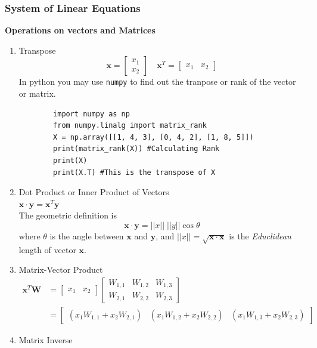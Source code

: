 \documentclass{article}
\newcommand{\matr}[1]{\mathbf{#1}}
\begin{document}
\subsubsection{System of Linear Equations}
\textbf{Operations on vectors and Matrices}
\begin{enumerate}
    \item Transpose \\
    \[\matr{x} = \begin{bmatrix}
        x_1 \\
        x_2
    \end{bmatrix} \quad \matr{x}^T = \begin{bmatrix}
        x_1& x_2
    \end{bmatrix}\]
    In python you may use \texttt{numpy} to find out the tranpose or rank of the vector or matrix.
    \begin{verbatim}
        import numpy as np
        from numpy.linalg import matrix_rank
        X = np.array([[1, 4, 3], [0, 4, 2], [1, 8, 5]]) 
        print(matrix_rank(X)) #Calculating Rank
        print(X)
        print(X.T) #This is the transpose of X
    \end{verbatim}
    \item Dot Product or Inner Product of Vectors \\
    $\matr{x}\cdot\matr{y} = \matr{x}^T\matr{y}$\\
    The geometric definition is 
    \[\matr{x}\cdot\matr{y} = ||x||\;||y||\cos{\theta}\]
    where $\theta$ is the angle between $\matr{x}$ and $\matr{y}$, and $||x|| = \sqrt{\matr{x}\cdot\matr{x}}$ is the \textit{Educlidean} length of vector $\matr{x}$.
    \item Matrix-Vector Product 
    \begin{align*}
        \matr{x}^T\matr{W} &= \begin{bmatrix} x_1 & x_2 \end{bmatrix} \begin{bmatrix} W_{1,1} & W_{1,2} & W_{1,3} \\ W_{2,1} & W_{2,2} & W_{2,3} \end{bmatrix}\\
        & = \begin{bmatrix} (x_1 W_{1,1} + x_2 W_{2,1}) & (x_1 W_{1,2} + x_2 W_{2,2}) & (x_1 W_{1,3} + x_2 W_{2,3}) \end{bmatrix}
    \end{align*}
    \item Matrix Inverse \\

\end{enumerate}
\end{document}
